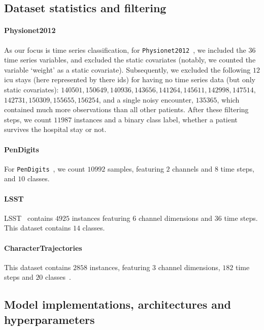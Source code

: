 \documentclass{article}
\begin{document}
\subsection{Dataset statistics and filtering} \label{supp: Dataset stats}
\paragraph{Physionet2012}
As our focus is time series classification, for \texttt{Physionet2012}~\citep{goldberger2000physiobank}, we included the 36 time series variables, and excluded the static covariates (notably, we counted the variable `weight' as a static covariate). Subsequently, we excluded the following $12$ icu stays (here represented by there ids) for having no time series data (but only static covariates): $140501, 150649, 140936, 143656, 141264, 145611, 142998, 147514,$  $142731, 150309, 155655, 156254 $, and a single noisy encounter, $135365$, which contained much more observations than all other patients. After these filtering steps, we count $11987$ instances and a binary class label, whether a patient survives the hospital stay or not.

\paragraph{PenDigits}
For \texttt{PenDigits}~\citep{Dua2019}, we count $10992$ samples, featuring $2$ channels and $8$ time steps, and $10$ classes.

\paragraph{LSST}
LSST~\citep{allam2018photometric} contains $4925$ instances featuring $6$ channel dimensions and $36$ time steps. This dataset contains $14$ classes.

 \paragraph{CharacterTrajectories}
 This dataset contains $2858$ instances, featuring $3$ channel dimensions, $182$ time steps and $20$ classes~\citep{Dua2019}.


\subsection{Model implementations, architectures and hyperparameters} \label{supp: Model Architectures}
\end{document}
